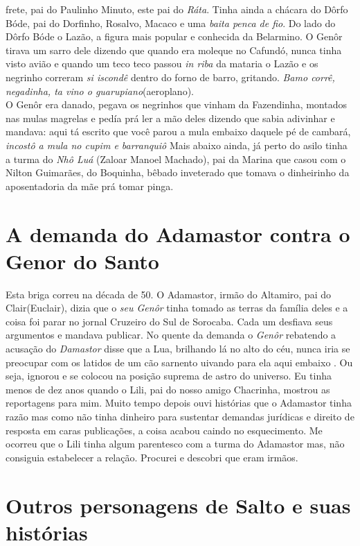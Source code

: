 \documentclass[12pt,brazil,]{book}
\begin{document}
frete, pai do Paulinho Minuto, este pai do \emph{Ráta}. Tinha ainda a
chácara do Dôrfo Bóde, pai do Dorfinho, Rosalvo, Macaco e uma
\emph{baita penca de fio}. Do lado do Dôrfo Bóde o Lazão, a figura mais
popular e conhecida da Belarmino. O Genôr tirava um sarro dele dizendo
que quando era moleque no Cafundó, nunca tinha visto avião e quando um
teco teco passou \emph{in riba} da mataria o Lazão e os negrinho
correram \emph{si iscondê} dentro do forno de barro, gritando.
\emph{Bamo corrê, negadinha, ta vino o guarupiano}(aeroplano).\\
O Genôr era danado, pegava os negrinhos que vinham da Fazendinha,
montados nas mulas magrelas e pedía prá ler a mão deles dizendo que
sabia adivinhar e mandava: aqui tá escrito que você parou a mula embaixo
daquele pé de cambará, \emph{incostô a mula no cupim e barranquiô} Mais
abaixo ainda, já perto do asilo tinha a turma do \emph{Nhô Luá} (Zaloar
Manoel Machado), pai da Marina que casou com o Nilton Guimarães, do
Boquinha, bêbado inveterado que tomava o dinheirinho da aposentadoria da
mãe prá tomar pinga.

\section{A demanda do Adamastor contra o Genor do
Santo}\label{a-demanda-do-adamastor-contra-o-genor-do-santo}

Esta briga correu na década de 50. O Adamastor, irmão do Altamiro, pai
do Clair(Euclair), dizia que o \emph{seu Genôr} tinha tomado as terras
da família deles e a coisa foi parar no jornal Cruzeiro do Sul de
Sorocaba. Cada um desfiava seus argumentos e mandava publicar. No quente
da demanda o \emph{Genôr} rebatendo a acusação do \emph{Damastor} disse
que a Lua, brilhando lá no alto do céu, nunca iria se preocupar com os
latidos de um cão sarnento uivando para ela aqui embaixo . Ou seja,
ignorou e se colocou na posição suprema de astro do universo. Eu tinha
menos de dez anos quando o Lili, pai do nosso amigo Chacrinha, mostrou
as reportagens para mim. Muito tempo depois ouvi histórias que o
Adamastor tinha razão mas como não tinha dinheiro para sustentar
demandas jurídicas e direito de resposta em caras publicações, a coisa
acabou caindo no esquecimento. Me ocorreu que o Lili tinha algum
parentesco com a turma do Adamastor mas, não consiguia estabelecer a
relação. Procurei e descobri que eram irmãos.

\section{Outros personagens de Salto e suas
histórias}\label{outros-personagens-de-salto-e-suas-histuxf3rias}
\end{document}

